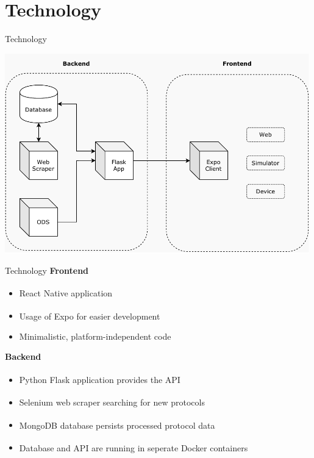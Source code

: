 \documentclass{beamer}
\newcounter{index}
\begin{document}
  \section{Technology}
  \begin{frame}[plain]{Technology}
    \begin{center}
      \includegraphics[width=0.99\textwidth]{fig/technology_overview.pdf}
    \end{center}
  \end{frame}

  \begin{frame}[plain]{Technology}
    \textbf{\faDesktop}\quad\textbf{Frontend}
    \begin{itemize}
      \item React Native\textsuperscript{\hyperlink{link-react-native}{}} application
      \item Usage of Expo\textsuperscript{\hyperlink{link-expo}{}} for easier development
      \item Minimalistic, platform-independent code
    \end{itemize}
    \textbf{\faServer}\quad\textbf{Backend}
    \begin{itemize}
      \item Python Flask\textsuperscript{\hyperlink{link-flask}{}} application provides the API
      \item Selenium\textsuperscript{\hyperlink{link-selenium}{}} web scraper searching for new protocols
      \item MongoDB\textsuperscript{\hyperlink{link-mongodb}{}} database persists processed protocol data
      \item Database and API are running in seperate Docker\textsuperscript{\hyperlink{link-docker}{}} containers
    \end{itemize}
  \end{frame}
\end{document}
